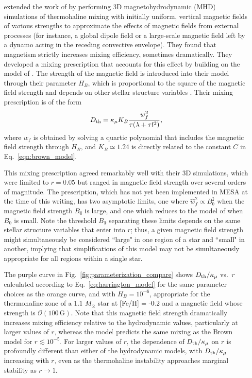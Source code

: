 \citet{harrington} extended the work of \citet{brown_etal_2013} by performing 3D magnetohydrodynamic (MHD) simulations of thermohaline mixing with initially uniform, vertical magnetic fields of various strengths to approximate the effects of magnetic fields from external processes (for instance, a global dipole field or a large-scale magnetic field left by a dynamo acting in the receding convective envelope). 
They found that magnetism strictly increases mixing efficiency, sometimes dramatically.
They developed a mixing prescription that accounts for this effect by building on the model of \citet{brown_etal_2013}.
The strength of the magnetic field is introduced into their model through their parameter $H_B$, which is proportional to the square of the magnetic field strength and depends on other stellar structure variables \citep[see Eq.~19 of][]{harrington}.
Their mixing prescription is of the form
\begin{equation} \label{eq:harrington_model}
    \Dth = \kappa_{\mu}K_B\frac{w_f^2}{\tau (\lambda + \tau l^2)},
\end{equation}
where $w_f$ is obtained by solving a quartic polynomial that includes the magnetic field strength through $H_B$, and $K_B \simeq 1.24$ is directly related to the constant $C$ in Eq.~\eqref{eqn:brown_model}.

This mixing prescription agreed remarkably well with their 3D simulations, which were limited to $r = 0.05$ but ranged in magnetic field strength over several orders of magnitude.
The prescription, which has not yet been implemented in MESA at the time of this writing, has two asymptotic limits, one where $\hat{w}_f^2 \propto B_0^2$ when the magnetic field strength $B_0$ is large, and one which reduces to the model of \citet{brown_etal_2013} when $B_0$ is small. 
Note the threshold $B_0$ separating these limits depends on the same stellar structure variables that enter into $r$; thus, a given magnetic field strength might simultaneously be considered ``large" in one region of a star and ``small" in another, implying that simplifications of this model may not be simultaneously appropriate for all regions within a single star.

The purple curve in Fig.~\ref{fig:parameterization_compare} shows $D_\mathrm{th}/\kappa_\mu$ vs.~$r$ calculated according to Eq.~\eqref{eq:harrington_model} for the same parameter choices as the orange curve, and with $H_B = 10^{-6}$, appropriate for the thermohaline zone of a 1.1 $M_\odot$ star at [Fe/H] = -0.2 and a magnetic field whose strength is $\mathcal{O}(100 \,\mathrm{G})$. 
Note that this magnetic field strength dramatically increases mixing efficiency relative to the hydrodynamic values, particularly at larger values of $r$, whereas the model predicts the same mixing as the Brown model for $r \lesssim 10^{-5}$. 
For larger values of $r$, the dependence of $D_\mathrm{th}/\kappa_\mu$ on $r$ is profoundly different than either of the hydrodynamic models, with $D_\mathrm{th}/\kappa_\mu$ increasing with $r$, even as the thermohaline instability approaches marginal stability as $r \to 1$.

